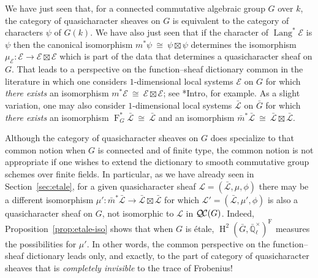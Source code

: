 \documentclass{amsart}
\theoremstyle{plain}
\theoremstyle{definition}
\theoremstyle{remark}
\newtheorem{remark}[theorem]{Remark}
\newcommand{\EE}{\mathbb{\bar Q}_\ell}
\newcommand{\Fq}{k}
\newcommand{\EEx}{\EE^\times}
\newcommand{\Frob}[1]{\operatorname{F}_{#1}}
\DeclareMathOperator{\Hh}{H}
\DeclareMathOperator{\Lang}{Lang}
\newcommand{\iso}{{\ \cong\ }}
\newcommand{\qcs}[1]{{\mathcal{#1}}}
\newcommand{\gqcs}[1]{{\mathcal{\bar #1}}}
\newcommand{\QC}{{\mathcal{Q\hskip-0.8pt C}}}
\newcommand{\bm}{\bar{m}}
\newcommand{\bG}{\bar{G}}
\begin{document}
We have just seen that, for a connected commutative algebraic group $G$ over $\Fq$, the category of quasicharacter sheaves on $G$ is equivalent to the category of characters $\psi$ of $G(\Fq)$.
We have also just seen that if the character of $\Lang^*\qcs{E}$ is $\psi$ then the canonical isomorphism $m^*\psi \iso \psi \boxtimes \psi$ determines the isomorphism $\mu_\qcs{E} : \qcs{E} \to \qcs{E}\boxtimes\qcs{E}$ which is part of the data that determines a quasicharacter sheaf on $G$.
That leads to a perspective on the function--sheaf dictionary common in the literature in which one considers $1$-dimensional local systems $\qcs{E}$ on $G$ for which \emph{there exists} an isomorphism $m^*\qcs{E} \iso \qcs{E} \boxtimes\qcs{E}$; see \cite{kamgarpour:09a}*{Intro}, for example.
As a slight variation, one may also consider $1$-dimensional local systems $\gqcs{L}$ on $\bG$ for which \emph{there exists} an isomorphism $\Frob{G}^*\gqcs{L} \iso \gqcs{L}$ and an isomorphism $\bm^*\gqcs{L} \iso \gqcs{L} \boxtimes\gqcs{L}$.

Although the category of quasicharacter sheaves on $G$ does specialize to that common notion when $G$ is connected and of finite type, the common notion is not appropriate if one wishes to extend the dictionary to smooth commutative group schemes over finite fields. 
In particular, as we have already seen in Section~\ref{sec:etale}, for a given quasicharacter sheaf $\qcs{L} = (\gqcs{L},\mu,\phi)$ there may be a different isomorphism $\mu' : \bm^*\gqcs{L} \to \gqcs{L}\boxtimes\gqcs{L}$ for which $\qcs{L}'=(\gqcs{L},\mu',\phi)$ is also a quasicharacter sheaf on $G$, not isomorphic to $\qcs{L}$ in $\QC(G)$.
Indeed, Proposition~\ref{prop:etale-iso} shows that when $G$ is étale, $\Hh^2(\bG,\EEx)^{\Frob{}}$ measures the possibilities for $\mu'$.
In other words, the common perspective on the function--sheaf dictionary leads only, and exactly, to the part of category of quasicharacter sheaves that is {\it completely invisible} to the trace of Frobenius! 
\end{document}
